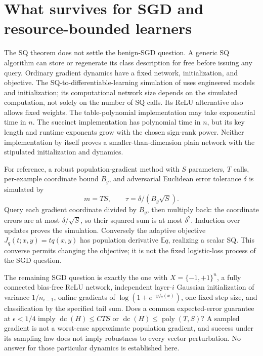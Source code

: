 \documentclass[11pt]{article}
\DeclareMathOperator{\dc}{dc}
\newcommand{\E}{\mathbb E}
\newcommand{\1}{\mathbf 1}
\begin{document}
\section{What survives for SGD and resource-bounded learners}\label{sec:resources}
The SQ theorem does not settle the benign-SGD question. A generic SQ algorithm can store or regenerate its class description for free before issuing any query. Ordinary gradient dynamics have a fixed network, initialization, and objective. The SQ-to-differentiable-learning simulation of \citet{AKMSS21} uses engineered models and initialization; its computational network size depends on the simulated computation, not solely on the number of SQ calls. Its ReLU alternative also allows fixed weights. The table-polynomial implementation may take exponential time in $n$. The succinct implementation has polynomial time in $n$, but its key length and runtime exponents grow with the chosen sign-rank power. Neither implementation by itself proves a smaller-than-dimension plain network with the stipulated initialization and dynamics.

For reference, a robust population-gradient method with $S$ parameters, $T$ calls, per-example coordinate bound $B_g$, and adversarial Euclidean error tolerance $\delta$ is simulated by
\[
 m=TS,\qquad\tau=\delta/(B_g\sqrt S).
\]
Query each gradient coordinate divided by $B_g$, then multiply back: the coordinate errors are at most $\delta/\sqrt S$, so their squared sum is at most $\delta^2$. Induction over updates proves the simulation. Conversely the adaptive objective $J_q(t;x,y)=tq(x,y)$ has population derivative $\E q$, realizing a scalar SQ. This converse permits changing the objective; it is not the fixed logistic-loss process of the SGD question.

The remaining SGD question is exactly the one with $X=\{-1,+1\}^n$, a fully connected bias-free ReLU network, independent layer-$i$ Gaussian initialization of variance $1/n_{i-1}$, online gradients of $\log(1+e^{-yf_\theta(x)})$, one fixed step size, and classification by the specified tail sum. Does a common expected-error guarantee at $\epsilon<1/4$ imply $\dc(H)\le CTS$ or $\dc(H)\le\operatorname{poly}(T,S)$? A sampled gradient is not a worst-case approximate population gradient, and success under its sampling law does not imply robustness to every vector perturbation. No answer for those particular dynamics is established here.
\end{document}
